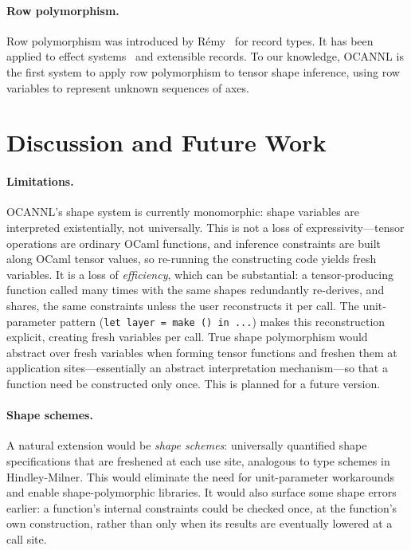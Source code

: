 \documentclass[acmsmall,nonacm,review]{acmart}
\newcommand{\code}[1]{\lstinline[basicstyle=\normalsize\ttfamily]{#1}}
\begin{document}
\paragraph{Row polymorphism.}
Row polymorphism was introduced by R{\'e}my~\cite{remy1993type} for record
types. It has been applied to effect systems~\cite{leijen2014koka} and
extensible records. To our knowledge, OCANNL is the first system to apply
row polymorphism to tensor shape inference, using row variables to represent
unknown sequences of axes.

\section{Discussion and Future Work}
\label{sec:discussion}

\paragraph{Limitations.}
OCANNL's shape system is currently monomorphic: shape variables are
interpreted existentially, not universally. This is not a loss of
expressivity---tensor operations are ordinary OCaml functions, and inference
constraints are built along OCaml tensor values, so re-running the
constructing code yields fresh variables. It is a loss of \emph{efficiency},
which can be substantial: a tensor-producing function called many times with
the same shapes redundantly re-derives, and shares, the same constraints
unless the user reconstructs it per call. The unit-parameter pattern
(\code{let layer = make () in ...}) makes this reconstruction explicit,
creating fresh variables per call. True shape polymorphism would abstract
over fresh variables when forming tensor functions and freshen them at
application sites---essentially an abstract interpretation mechanism---so
that a function need be constructed only once. This is planned for a future
version.

\paragraph{Shape schemes.}
A natural extension would be \emph{shape schemes}: universally quantified
shape specifications that are freshened at each use site, analogous to
type schemes in Hindley-Milner. This would eliminate the need for
unit-parameter workarounds and enable shape-polymorphic libraries. It would
also surface some shape errors earlier: a function's internal constraints
could be checked once, at the function's own construction, rather than only
when its results are eventually lowered at a call site.
\end{document}
